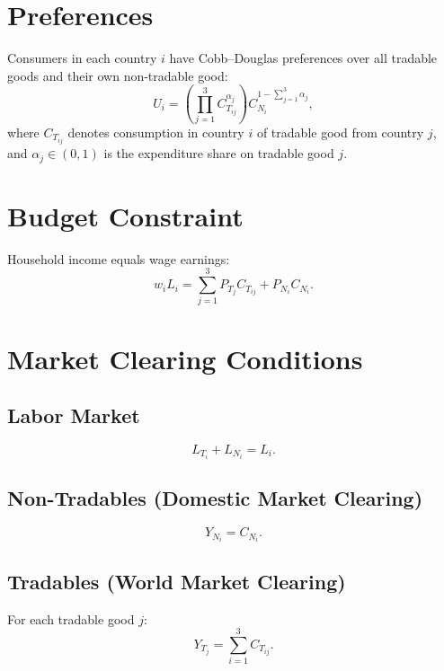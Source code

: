 \documentclass[11pt]{article}
\begin{document}
\section{Preferences}

Consumers in each country \( i \) have Cobb--Douglas preferences over all tradable goods and their own non-tradable good:
\begin{equation}
U_i = \left( \prod_{j=1}^3 C_{T_{ij}}^{\alpha_j} \right)
C_{N_i}^{1 - \sum_{j=1}^3 \alpha_j},
\end{equation}
where \( C_{T_{ij}} \) denotes consumption in country \( i \) of tradable good from country \( j \), and \( \alpha_j \in (0,1) \) is the expenditure share on tradable good \( j \).

\section{Budget Constraint}

Household income equals wage earnings:
\begin{equation}
w_i L_i = \sum_{j=1}^3 P_{T_j} C_{T_{ij}} + P_{N_i} C_{N_i}.
\end{equation}

\section{Market Clearing Conditions}

\subsection*{Labor Market}
\begin{equation}
L_{T_i} + L_{N_i} = L_i.
\end{equation}

\subsection*{Non-Tradables (Domestic Market Clearing)}
\begin{equation}
Y_{N_i} = C_{N_i}.
\end{equation}

\subsection*{Tradables (World Market Clearing)}
For each tradable good \( j \):
\begin{equation}
Y_{T_j} = \sum_{i=1}^3 C_{T_{ij}}.
\end{equation}
\end{document}
